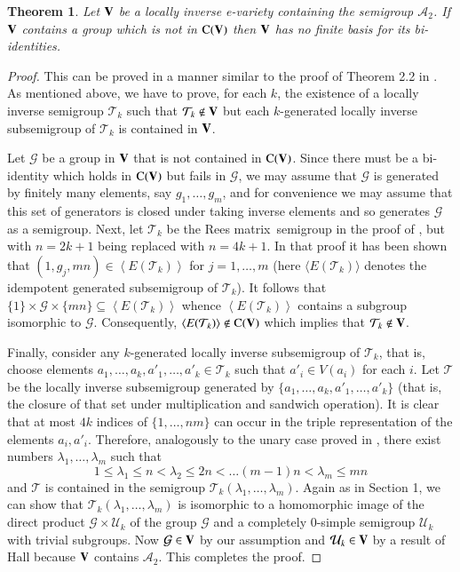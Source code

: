 \documentclass[preprint,1p,times]{elsarticle}
\numberwithin{equation}{section}
\newtheorem{Thm}{Theorem}[section]
\theoremstyle{remark}
\def\pv#1{{\bf #1}}
\def\la{\lambda}
\def\Co{{\mathrm C}}
\def\Rm{Rees matrix}
\begin{document}
\begin{Thm}\label{Theorem 4.4} Let $\pv V$ be a locally inverse
e-variety containing the semigroup $\mathcal{A}_2$. If $\pv V$ contains a group which is not in $\Co(\pv V)$ then $\pv
V$ has no finite basis for its bi-identities.
\end{Thm}

\begin{proof} This can be proved in a manner similar to the proof of
Theorem 2.2 in \cite{adv}.  As mentioned above, we have to prove, for each $k$, the existence of a locally inverse
semigroup $\mathcal{T}_k$ such that $\mathcal{T}_k\notin \pv V$ but each $k$-generated locally inverse subsemigroup of
$\mathcal{T}_k$ is contained in $\pv V$.

Let $\mathcal G$ be a group in $\pv V$ that is not contained in $\Co(\pv V)$. Since there must be a bi-identity which
holds in $\Co(\pv V)$ but fails in $\mathcal G$, we may assume that $\mathcal G$ is generated by finitely many
elements, say $g_1,\dots, g_m$, and for convenience we may assume that this set of generators is closed under taking
inverse elements and so generates $\mathcal{G}$ as a semigroup. Next, let $\mathcal{T}_k$ be the \Rm\ semigroup in the
proof of \cite[Theorem 2.2]{adv}, but with $n=2k+1$ being replaced with $n=4k+1$. In that proof it has been shown that
$(1,g_j,mn)\in \left<E(\mathcal{T}_k)\right>$ for $j=1,\dots, m$ (here $\langle E(\mathcal{T}_k)\rangle$ denotes the
idempotent generated subsemigroup of $\mathcal{T}_k$). It follows that $\{1\}\times \mathcal{G}\times\{mn\}\subseteq
\left<E(\mathcal{T}_k)\right>$ whence $\left<E(\mathcal{T}_k)\right>$ contains a subgroup isomorphic to $\mathcal{G}$.
Consequently, $\left<E(\mathcal{T}_k)\right>\notin \Co(\pv V)$ which implies that $\mathcal{T}_k\notin \pv V$.

Finally, consider any $k$-generated locally inverse subsemigroup of $\mathcal{T}_k$, that is, choose elements
$a_1,\dots,a_k,a'_1,\dots,a'_k\in \mathcal{T}_k$ such that $a'_i\in V(a_i)$ for each $i$. Let $\mathcal{T}$ be the
locally inverse subsemigroup generated by $\{a_1,\dots,a_k,a'_1,\dots,a'_k\}$ (that is, the closure of that set under
multiplication and sandwich operation). It is clear that at most $4k$ indices of $\{1,\dots,nm\}$ can occur in the
triple representation of the elements $a_i,a'_i$. Therefore, analogously to the unary case proved in \cite[Theorem
2.2]{adv}, there exist numbers $\la_1,\dots,\la_m$ such that
$$1\le\la_1\le n<\la_2\le 2n < \dots (m-1)n<\la_m\le mn$$
and $\mathcal{T}$ is contained in the semigroup $\mathcal{T}_k(\la_1,\dots,\la_m)$. Again as in Section 1, we can show
that $\mathcal{T}_k(\la_1,\dots,\la_m)$ is isomorphic to a homomorphic image of the direct product $\mathcal{G}\times
\mathcal{U}_k$ of the group $\mathcal G$ and a completely 0-simple semigroup $\mathcal{U}_k$ with trivial subgroups.
Now $\mathcal{G}\in \pv V$ by our assumption and $\mathcal{U}_k\in \pv V$ by a result of Hall \cite{H2} because $\pv V$
contains $\mathcal{A}_2$. This completes the proof.
\end{proof}
\end{document}
